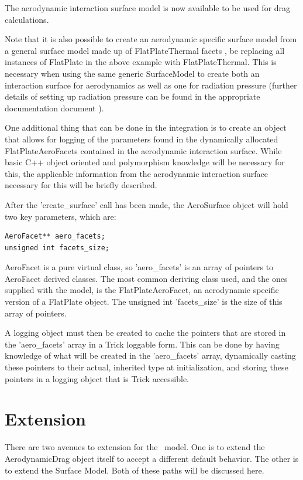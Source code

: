 The aerodynamic interaction surface model is now available to be used
for drag calculations.

Note that it is also possible to create an aerodynamic specific
surface model from a general surface model made up of
FlatPlateThermal facets \cite{dynenv:SURFACEMODEL}, be replacing
all instances of FlatPlate in the above example with FlatPlateThermal.
This is necessary when using the same generic SurfaceModel to create
both an interaction surface for aerodynamics as well as one for
radiation pressure (further details of setting up radiation pressure
can be found in the appropriate documentation document \cite{dynenv:RADIATIONPRESSURE}).

One additional thing that can be done in the integration is to
create an object that allows for logging of the parameters found
in the dynamically allocated FlatPlateAeroFacets contained in the
aerodynamic interaction surface. While basic
C++ object oriented and polymorphism knowledge will be necessary
for this, the applicable information from the aerodynamic interaction
surface necessary for this will be briefly described.

After the 'create\_surface' call has been made, the AeroSurface
object will hold two key parameters, which are:

\begin{verbatim}
AeroFacet** aero_facets;
unsigned int facets_size;
\end{verbatim}

AeroFacet is a pure virtual class, so 'aero\_facets' is an array
of pointers to AeroFacet derived classes. The most common deriving
class used, and the ones supplied with the model, is the
FlatPlateAeroFacet, an aerodynamic specific version of a FlatPlate
\cite{dynenv:SURFACEMODEL} object. The unsigned int 'facets\_size' is
the size of this array of pointers.

A logging object must then be created to cache the pointers that are
stored in the 'aero\_facets' array in a Trick loggable form. This
can be done by having knowledge of what will be created
in the 'aero\_facets' array, dynamically casting these pointers
to their actual, inherited type at initialization, and storing
these pointers in a logging object that is Trick accessible.

\section{Extension}

There are two avenues to extension for the \aerodynamicsDesc\ model.
One is to extend the AerodynamicDrag object itself to accept a different
default behavior. The other is to extend the Surface Model. Both
of these paths will be discussed here.

